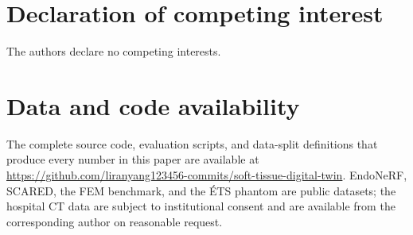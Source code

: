 \documentclass[review]{elsarticle}
\begin{document}
\section*{Declaration of competing interest}
The authors declare no competing interests.

\section*{Data and code availability}
The complete source code, evaluation scripts, and data-split definitions
that produce every number in this paper are available at
\url{https://github.com/liranyang123456-commits/soft-tissue-digital-twin}. EndoNeRF, SCARED, the FEM
benchmark, and the \'ETS phantom are public datasets; the hospital CT data
are subject to institutional consent and are available from the
corresponding author on reasonable request.


\end{document}
